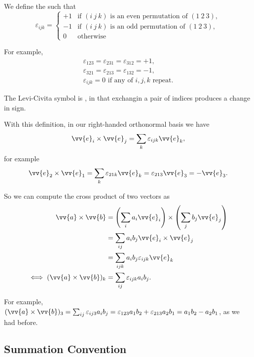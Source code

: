 \begin{definition}
    We define the  such that
    $$
    \varepsilon_{ijk} = \begin{cases}
        +1 &\mbox{if } (i\ j\ k) \text{ is an even permutation of } (1\ 2\ 3), \\
        -1 &\mbox{if } (i\ j\ k) \text{ is an odd permutation of } (1\ 2\ 3), \\ 
        0 &\mbox{otherwise}
       \end{cases}
    $$
\end{definition}

For example,
\begin{align*}
    \varepsilon_{123} =  \varepsilon_{231} =  \varepsilon_{312} = +1, \\
    \varepsilon_{321} =  \varepsilon_{213} =  \varepsilon_{132} = -1, \\
    \varepsilon_{ijk} = 0 \text{ if any of } i,j,k \text{ repeat.}
\end{align*}

The Levi-Civita symbol is , in that exchangin a pair of indices produces a change in sign.

With this definition, in our right-handed orthonormal basis we have
$$
\vv{e}_i \times \vv{e}_j = \sum_k \varepsilon_{ijk} \vv{e}_k,
$$
for example
$$
\vv{e}_2 \times \vv{e}_1 = \sum_k \varepsilon_{21k}\vv{e}_k = \varepsilon_{213} \vv{e}_3 = - \vv{e}_3.
$$

So we can compute the cross product of two vectors as
\begin{align*}
    \vv{a}\times \vv{b} &= \left(\sum_i a_i \vv{e}_i\right) \times \left(\sum_j b_j \vv{e}_j\right) \\
    &= \sum_{ij} a_i b_j \vv{e}_i \times \vv{e}_j \\
    &= \sum_{ijk} a_i b_j \varepsilon_{ijk} \vv{e}_k \\
\iff (\vv{a} \times \vv{b})_k &= \sum_{ij} \varepsilon_{ijk} a_i b_j.
\end{align*}

For example, $(\vv{a} \times \vv{b})_3 = \sum_{ij} \varepsilon_{ij3} a_i b_j = \varepsilon_{123} a_1 b_2 + \varepsilon_{213} a_2 b_1 = a_1 b_2 - a_2 b_1$, as we had before.

\subsection{Summation Convention}

